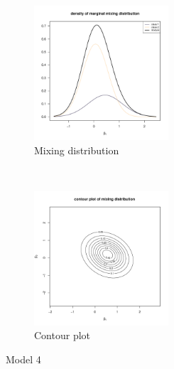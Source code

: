 \documentclass[10pt,a4paper]{article}
\begin{document}
	\begin{figure}[h!]
		\centering
		\begin{subfigure}[t]{0.5\textwidth}
			\centering
			\includegraphics[width=5cm]{results/train_Cf/marginal.pdf}
			\caption{Mixing distribution}
		\end{subfigure}%
		~ 
		\begin{subfigure}[t]{0.5\textwidth}
			\centering
			\includegraphics[width=5cm]{results/train_Cf/contour.pdf}
			\caption{Contour plot}
		\end{subfigure}
		\caption{Model 4}
	\end{figure}
\end{document}
